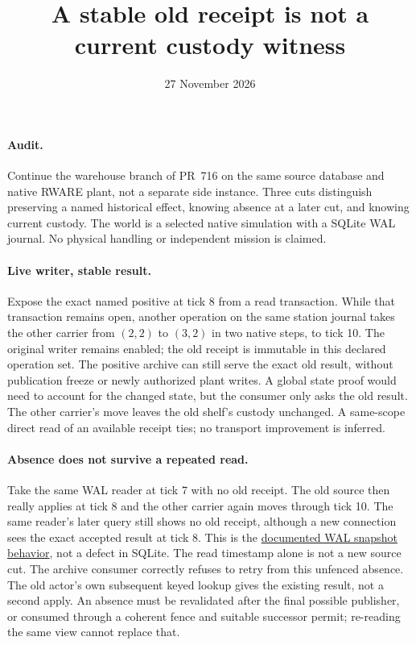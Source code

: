\documentclass[11pt]{article}
\title{A stable old receipt is not a current custody witness}
\date{27 November 2026}
\begin{document}
\maketitle
\paragraph{Audit.}
Continue the warehouse branch of PR~716 on the same source
database and native RWARE plant, not a separate side instance.
Three cuts distinguish preserving a named historical effect,
knowing absence at a later cut, and knowing current custody.
The world is a selected native simulation with a SQLite WAL
journal. No physical handling or independent mission is claimed.

\paragraph{Live writer, stable result.}
Expose the exact named positive at tick 8 from a read
transaction. While that transaction remains open, another
operation on the same station journal takes the other carrier
from \((2,2)\) to \((3,2)\) in two native steps, to tick 10.
The original writer remains enabled; the old receipt is
immutable in this declared operation set. The positive archive
can still serve the exact old result, without publication
freeze or newly authorized plant writes. A global state proof
would need to account for the changed state, but the consumer
only asks the old result. The other carrier's move leaves the
old shelf's custody unchanged. A same-scope direct read of an
available receipt ties; no transport improvement is inferred.

\paragraph{Absence does not survive a repeated read.}
Take the same WAL reader at tick 7 with no old receipt.
The old source then really applies at tick 8 and the other
carrier again moves through tick 10. The same reader's later
query still shows no old receipt, although a new connection
sees the exact accepted result at tick 8. This is the
\href{https://www.sqlite.org/isolation.html}{documented WAL snapshot behavior},
not a defect in SQLite. The read timestamp alone is not a new
source cut. The archive consumer correctly refuses to retry
from this unfenced absence. The old actor's own subsequent
keyed lookup gives the existing result, not a second apply.
An absence must be revalidated after the final possible
publisher, or consumed through a coherent fence and suitable
successor permit; re-reading the same view cannot replace that.
\end{document}
